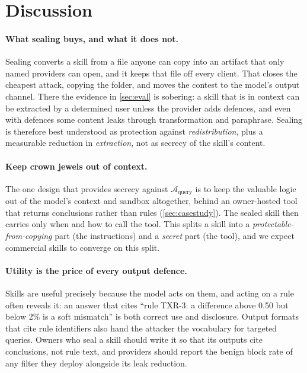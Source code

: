\section{Discussion}
\label{sec:discussion}

\paragraph{What sealing buys, and what it does not.}
Sealing converts a skill from a file anyone can copy into an artifact that only named providers can
open, and it keeps that file off every client. That closes the cheapest attack, copying the folder,
and moves the contest to the model's output channel. There the evidence in \cref{sec:eval} is
sobering: a skill that is in context can be extracted by a determined user unless the provider
adds defences, and even with defences some content leaks through transformation and paraphrase.
Sealing is therefore best understood as protection against \emph{redistribution}, plus a
measurable reduction in \emph{extraction}, not as secrecy of the skill's content.

\paragraph{Keep crown jewels out of context.}
The one design that provides secrecy against $\mathcal{A}_{\text{query}}$ is to keep the valuable
logic out of the model's context and sandbox altogether, behind an owner-hosted tool that returns
conclusions rather than rules (\cref{sec:casestudy}). The sealed skill then carries only when and
how to call the tool. This splits a skill into a \emph{protectable-from-copying} part (the
instructions) and a \emph{secret} part (the tool), and we expect commercial skills to converge on
this split.

\paragraph{Utility is the price of every output defence.}
Skills are useful precisely because the model acts on them, and acting on a rule often reveals it:
an answer that cites ``rule TXR-3: a difference above 0.50 but below 2\% is a soft mismatch'' is
both correct use and disclosure. Output formats that cite rule identifiers also hand the attacker
the vocabulary for targeted queries. Owners who seal a skill should write it so that its outputs
cite conclusions, not rule text, and providers should report the benign block rate of any filter
they deploy alongside its leak reduction.

